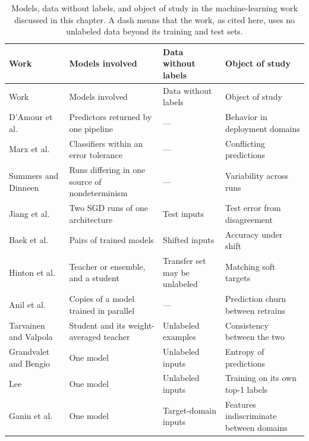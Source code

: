 {\small{}%
\begin{xltabular}{\textwidth}{@{}>{\raggedright\arraybackslash}p{0.22\textwidth}>{\raggedright\arraybackslash}X>{\raggedright\arraybackslash}p{0.2\textwidth}>{\raggedright\arraybackslash}X@{}}
\caption[Models, unlabeled data, and object of study in the machine-learning work]{Models, data without labels, and object of study in the
machine-learning work discussed in this chapter. A dash means that the
work, as cited here, uses no unlabeled data beyond its training and
test sets.}
\label{tab:related-ml}\\
\toprule
Work & Models involved & Data without labels & Object of study \\
\midrule
\endfirsthead
\toprule
Work & Models involved & Data without labels & Object of study \\
\midrule
\endhead
\bottomrule
\endlastfoot
D'Amour et al.~\cite{damour2020underspecification}
 & Predictors returned by one pipeline & --- & Behavior in deployment domains \\
Marx et al.~\cite{marx2020predictive}
 & Classifiers within an error tolerance & --- & Conflicting predictions \\
Summers and Dinneen~\cite{summers2021nondeterminism}
 & Runs differing in one source of nondeterminism & --- & Variability across runs \\
Jiang et al.~\cite{jiang2022assessing}
 & Two SGD runs of one architecture & Test inputs & Test error from disagreement \\
Baek et al.~\cite{baek2022agreement}
 & Pairs of trained models & Shifted inputs & Accuracy under shift \\
\midrule
Hinton et al.~\cite{hinton2015distilling}
 & Teacher or ensemble, and a student & Transfer set may be unlabeled & Matching soft targets \\
Anil et al.~\cite{anil2018large}
 & Copies of a model trained in parallel & --- & Prediction churn between retrains \\
Tarvainen and Valpola~\cite{tarvainen2017mean}
 & Student and its weight-averaged teacher & Unlabeled examples & Consistency between the two \\
Grandvalet and Bengio~\cite{grandvalet2004semi}
 & One model & Unlabeled inputs & Entropy of predictions \\
Lee~\cite{lee2013pseudo}
 & One model & Unlabeled inputs & Training on its own top-1 labels \\
Ganin et al.~\cite{ganin2016domain}
 & One model & Target-domain inputs & Features indiscriminate between domains \\

\end{xltabular}}
